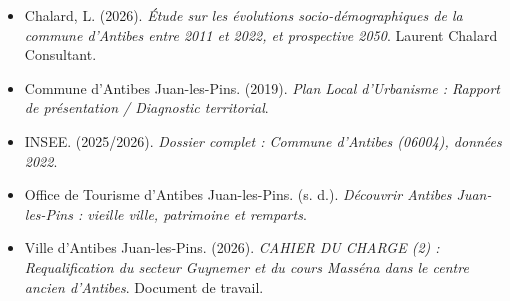 \documentclass[11pt,a4paper]{report}
\begin{document}
\begin{itemize}
  \item Chalard, L. (2026). \emph{Étude sur les évolutions socio-démographiques de la commune d'Antibes entre 2011 et 2022, et prospective 2050}. Laurent Chalard Consultant.
  \item Commune d'Antibes Juan-les-Pins. (2019). \emph{Plan Local d'Urbanisme : Rapport de présentation / Diagnostic territorial}.
  \item INSEE. (2025/2026). \emph{Dossier complet : Commune d'Antibes (06004), données 2022}.
  \item Office de Tourisme d'Antibes Juan-les-Pins. (s. d.). \emph{Découvrir Antibes Juan-les-Pins : vieille ville, patrimoine et remparts}.
  \item Ville d'Antibes Juan-les-Pins. (2026). \emph{CAHIER DU CHARGE (2) : Requalification du secteur Guynemer et du cours Masséna dans le centre ancien d'Antibes}. Document de travail.
\end{itemize}
\end{document}
